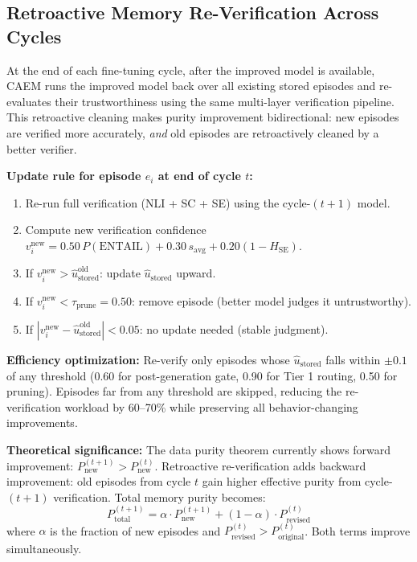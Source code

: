\documentclass[12pt,a4paper]{article}
\theoremstyle{definition}
\newcommand{\caem}{\textsc{CAEM}}
\newcommand{\ustored}{\hat{u}_{\text{stored}}}
\begin{document}
\subsection{Retroactive Memory Re-Verification Across Cycles}

At the end of each fine-tuning cycle, after the improved model is available, \caem{} runs the improved model back over all existing stored episodes and re-evaluates their trustworthiness using the same multi-layer verification pipeline. This retroactive cleaning makes purity improvement bidirectional: new episodes are verified more accurately, \textit{and} old episodes are retroactively cleaned by a better verifier.

\textbf{Update rule for episode $e_i$ at end of cycle $t$:}
\begin{enumerate}
    \item Re-run full verification (NLI + SC + SE) using the cycle-$(t{+}1)$ model.
    \item Compute new verification confidence $v_i^{\text{new}} = 0.50\,P(\text{ENTAIL}) + 0.30\,s_{\text{avg}} + 0.20(1{-}H_{\text{SE}})$.
    \item If $v_i^{\text{new}} > \ustored^{\text{old}}$: update $\ustored$ upward.
    \item If $v_i^{\text{new}} < \tau_{\text{prune}} = 0.50$: remove episode (better model judges it untrustworthy).
    \item If $|v_i^{\text{new}} - \ustored^{\text{old}}| < 0.05$: no update needed (stable judgment).
\end{enumerate}

\textbf{Efficiency optimization:} Re-verify only episodes whose $\ustored$ falls within $\pm 0.1$ of any threshold (0.60 for post-generation gate, 0.90 for Tier 1 routing, 0.50 for pruning). Episodes far from any threshold are skipped, reducing the re-verification workload by 60--70\% while preserving all behavior-changing improvements.

\textbf{Theoretical significance:} The data purity theorem currently shows forward improvement: $P_{\text{new}}^{(t+1)} > P_{\text{new}}^{(t)}$. Retroactive re-verification adds backward improvement: old episodes from cycle $t$ gain higher effective purity from cycle-$(t{+}1)$ verification. Total memory purity becomes:
\[
P_{\text{total}}^{(t+1)} = \alpha \cdot P_{\text{new}}^{(t+1)} + (1-\alpha) \cdot P_{\text{revised}}^{(t)}
\]
where $\alpha$ is the fraction of new episodes and $P_{\text{revised}}^{(t)} > P_{\text{original}}^{(t)}$. Both terms improve simultaneously.
\end{document}
